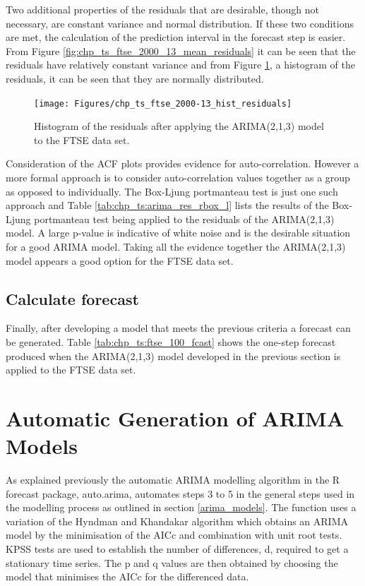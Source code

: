 Two additional properties of the residuals that are desirable, though not necessary, are constant variance and normal distribution. If these two conditions are met, the calculation of the prediction interval in the forecast step is easier. From Figure \ref{fig:chp_ts_ftse_2000_13_mean_residuals} it can be seen that the residuals have relatively constant variance and from Figure \ref{fig:chp_ts_ftse_2000_13_hist_residuals}, a histogram of the residuals, it can be seen that they are normally distributed.

\begin{figure}[!tbh]
\centering
\texttt{[image: Figures/chp\_ts\_ftse\_2000-13\_hist\_residuals]}
\caption[Histogram of the FTSE 100 ARIMA model residuals]{Histogram of the residuals after applying the ARIMA(2,1,3) model to the FTSE data set.}
\label{fig:chp_ts_ftse_2000_13_hist_residuals}
\end{figure}

Consideration of the ACF plots provides evidence for auto-correlation. However a more formal approach is to consider auto-correlation values together as a group as opposed to individually. The Box-Ljung portmanteau test is just one such approach and Table \ref{tab:chp_ts:arima_res_rbox_l} lists the results of the Box-Ljung portmanteau test being applied to the residuals of the ARIMA(2,1,3) model. A large p-value is indicative of white noise and is the desirable situation for a good ARIMA model. Taking all the evidence together the ARIMA(2,1,3) model appears a good option for the FTSE data set.



\subsection{Calculate forecast}
Finally, after developing a model that meets the previous criteria a forecast can be generated. Table \ref{tab:chp_ts:ftse_100_fcast} shows the one-step forecast produced when the ARIMA(2,1,3) model developed in the previous section is applied to the FTSE data set.
 


\section{Automatic Generation of ARIMA Models}
As explained previously the automatic ARIMA modelling algorithm in the R forecast package, auto.arima, automates steps 3 to 5 in the general steps used in the modelling process as outlined in section \ref{arima_models}. The function uses a variation of the Hyndman and Khandakar algorithm which obtains an ARIMA model by the minimisation of the AICc and combination with unit root tests. KPSS tests are used to establish the number of differences, d, required to get a stationary time series. The p and q values are then obtained by choosing the model that minimises the AICc for the differenced data. 

